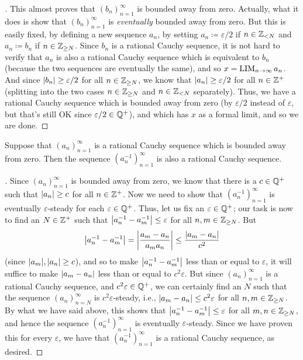 \begin{proof}[]
  This almost proves that \((b_n)_{n = 1}^{\infty}\) is bounded away from zero.
  Actually, what it does is show that \((b_n)_{n = 1}^{\infty}\) is \emph{eventually} bounded away from zero.
  But this is easily fixed, by defining a new sequence \(a_n\), by setting \(a_n \coloneqq \varepsilon / 2\) if \(n \in \mathbb{Z}_{< N}\) and \(a_n \coloneqq b_n\) if \(n \in \mathbb{Z}_{\geq N}\).
  Since \(b_n\) is a rational Cauchy sequence, it is not hard to verify that \(a_n\) is also a rational Cauchy sequence which is equivalent to \(b_n\) (because the two sequences are eventually the same), and so \(x = \operatorname*{LIM}_{n \to \infty} a_n\).
  And since \(\left\lvert b_n\right\rvert \geq \varepsilon / 2\) for all \(n \in \mathbb{Z}_{\geq N}\), we know that \(\left\lvert a_n\right\rvert \geq \varepsilon / 2\) for all \(n \in \mathbb{Z}^+\) (splitting into the two cases \(n \in \mathbb{Z}_{\geq N}\) and \(n \in \mathbb{Z}_{< N}\) separately).
  Thus, we have a rational Cauchy sequence which is bounded away from zero (by \(\varepsilon / 2\) instead of \(\varepsilon\), but that's still OK since \(\varepsilon / 2 \in \mathbb{Q}^+\)), and which has \(x\) as a formal limit, and so we are done.
\end{proof}

\begin{lem}\label{i:5.3.15}
  Suppose that \((a_n)_{n = 1}^{\infty}\) is a rational Cauchy sequence which is bounded away from zero.
  Then the sequence \((a_n^{-1})_{n = 1}^{\infty}\) is also a rational Cauchy sequence.
\end{lem}

\begin{proof}[]
  Since \((a_n)_{n = 1}^{\infty}\) is bounded away from zero, we know that there is a \(c \in \mathbb{Q}^+\) such that \(\left\lvert a_n\right\rvert \geq c\) for all \(n \in \mathbb{Z}^+\).
  Now we need to show that \((a_n^{-1})_{n = 1}^{\infty}\) is eventually \(\varepsilon\)-steady for each \(\varepsilon \in \mathbb{Q}^+\).
  Thus, let us fix an \(\varepsilon \in \mathbb{Q}^+\);
  our task is now to find an \(N \in \mathbb{Z}^+\) such that \(\left\lvert a_n^{-1} - a_m^{-1}\right\rvert \leq \varepsilon\) for all \(n, m \in \mathbb{Z}_{\geq N}\).
  But
  \[
    \left\lvert a_n^{-1} - a_m^{-1}\right\rvert = \left\lvert\dfrac{a_m - a_n}{a_m a_n}\right\rvert \leq \dfrac{\left\lvert a_m - a_n\right\rvert}{c^2}
  \]
  (since \(\abs{a_m}, \abs{a_n} \geq c\)), and so to make \(\left\lvert a_n^{-1} - a_m^{-1}\right\rvert\) less than or equal to \(\varepsilon\), it will suffice to make \(\left\lvert a_m - a_n\right\rvert\) less than or equal to \(c^2 \varepsilon\).
  But since \((a_n)_{n = 1}^{\infty}\) is a rational Cauchy sequence, and \(c^2 \varepsilon \in \mathbb{Q}^+\), we can certainly find an \(N\) such that the sequence \((a_n)_{n = N}^{\infty}\) is \(c^2 \varepsilon\)-steady, i.e., \(\left\lvert a_m - a_n\right\rvert \leq c^2 \varepsilon\) for all \(n, m \in \mathbb{Z}_{\geq N}\).
  By what we have said above, this shows that \(\left\lvert a_n^{-1} - a_m^{-1}\right\rvert \leq \varepsilon\) for all \(m, n \in \mathbb{Z}_{\geq N}\), and hence the sequence \((a_n^{-1})_{n = 1}^{\infty}\) is eventually \(\varepsilon\)-steady.
  Since we have proven this for every \(\varepsilon\), we have that \((a_n^{-1})_{n = 1}^{\infty}\) is a rational Cauchy sequence, as desired.
\end{proof}

